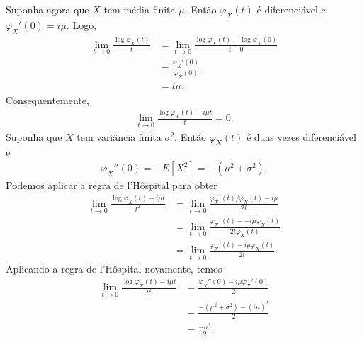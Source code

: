 \documentclass[../Notas.tex]{subfiles}
\begin{document}
Suponha agora que $X$ tem média finita $\mu$. Então $\varphi_X(t)$ é diferenciável e $\varphi_X'(0) = i\mu$. Logo,
\begin{align*}
    \lim_{t\to 0}\frac{\log\varphi_X(t)}{t} &= \lim_{t\to 0}\frac{ \log\varphi_X(t) - \log\varphi_X(0) }{t-0} \\
    &= \frac{\varphi_X'(0)}{\varphi_X(0)} \\
    &= i\mu.
\end{align*}
Consequentemente,
\begin{align*}
    \lim_{t\to 0} \frac{ \log\varphi_X(t) - i\mu t }{t} = 0.
\end{align*}
Suponha que $X$ tem variância finita $\sigma^2$. Então $\varphi_X(t)$ é duas vezes diferenciável e
\begin{align*}
    \varphi_X''(0) = -E[X^2] = -(\mu^2 + \sigma^2).
\end{align*}
Podemos aplicar a regra de l'Hôspital para obter
\begin{align*}
    \lim_{t\to 0} \frac{ \log\varphi_X(t) - i\mu t }{t^2} &= \lim_{t\to 0} \frac{ \varphi_X'(t)/\varphi_X(t) - i\mu }{2t} \\
    &= \lim_{t\to 0}\frac{ \varphi_X'(t) - -i\mu\varphi_X(t) }{2t\varphi_X(t)} \\
    &= \lim_{t\to 0}\frac{ \varphi_X'(t) - i\mu\varphi_X(t) }{2t}.
\end{align*}
Aplicando a regra de l'Hôspital novamente, temos
\begin{align}
    \lim_{t\to 0}\frac{ \log\varphi_X(t) - i\mu t }{t^2} &= \frac{ \varphi_X''(0) - i\mu\varphi_X'(0) }{2} \\
    &= \frac{ -(\mu^2 + \sigma^2) - (i\mu)^2}{2} \\
    &= \frac{ -\sigma^2 }{2}.
\end{align}
\end{document}
